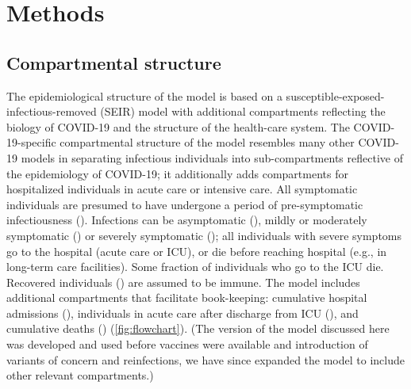 \documentclass[12pt]{article}\usepackage[]{graphicx}\usepackage[]{color}
\begin{document}
\section{Methods}

\subsection*{Compartmental structure}

The epidemiological structure of the model is based on a susceptible-exposed-infectious-removed (SEIR) model with additional compartments reflecting the biology of COVID-19 and the structure of the health-care system. 
The COVID-19-specific compartmental structure of the model resembles many other COVID-19 models \cite{childs2021impact, tuite2020mathematical, kainChopping2021} in separating infectious individuals into sub-compartments reflective of the epidemiology of COVID-19; it additionally adds compartments for hospitalized individuals in acute care or intensive care. 
All symptomatic individuals are presumed to have undergone a period of pre-symptomatic infectiousness (). 
Infections can be asymptomatic (), mildly or moderately symptomatic () or severely symptomatic (); all individuals with severe symptoms go to the hospital (acute care or ICU), or die before reaching hospital (e.g., in long-term care facilities).
Some fraction  of individuals who go to the ICU die. Recovered individuals () are assumed to be immune.  
The model includes additional compartments that facilitate book-keeping: cumulative hospital admissions (), individuals in acute care after discharge from ICU (), and cumulative deaths () (\cref{fig:flowchart}).
(The version of the model discussed here was developed and used before vaccines were available and introduction of variants of concern and reinfections, we have since expanded the model to include other relevant compartments.)

\end{document}
